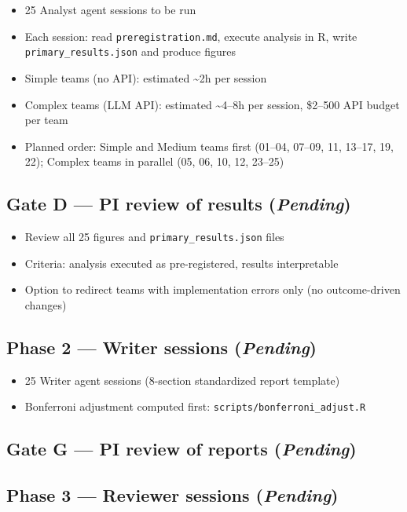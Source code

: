 \documentclass[12pt,a4paper]{article}
\begin{document}
\begin{itemize}
  \item 25 Analyst agent sessions to be run
  \item Each session: read \texttt{preregistration.md}, execute analysis in R,
    write \texttt{primary\_results.json} and produce figures
  \item Simple teams (no API): estimated \textasciitilde2h per session
  \item Complex teams (LLM API): estimated \textasciitilde4--8h per session,
    \$2--500 API budget per team
  \item Planned order: Simple and Medium teams first (01--04, 07--09, 11, 13--17,
    19, 22); Complex teams in parallel (05, 06, 10, 12, 23--25)
\end{itemize}

\subsection{Gate D --- PI review of results (\emph{Pending})}

\begin{itemize}
  \item Review all 25 figures and \texttt{primary\_results.json} files
  \item Criteria: analysis executed as pre-registered, results interpretable
  \item Option to redirect teams with implementation errors only
    (no outcome-driven changes)
\end{itemize}

\subsection{Phase 2 --- Writer sessions (\emph{Pending})}

\begin{itemize}
  \item 25 Writer agent sessions (8-section standardized report template)
  \item Bonferroni adjustment computed first: \texttt{scripts/bonferroni\_adjust.R}
\end{itemize}

\subsection{Gate G --- PI review of reports (\emph{Pending})}

\subsection{Phase 3 --- Reviewer sessions (\emph{Pending})}
\end{document}

